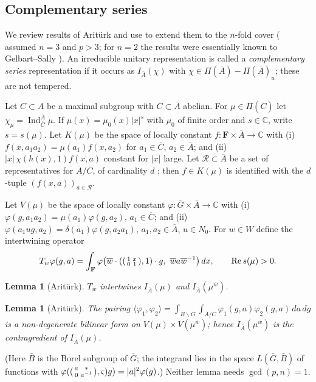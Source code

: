 \documentclass[12pt,letterpaper]{article}
\newtheorem{lemma}[theorem]{Lemma}
\theoremstyle{definition}
\theoremstyle{remark}
\newcommand{\F}{\mathbf{F}}
\newcommand{\C}{\mathbb C}
\newcommand{\bG}{\overline{G}}
\newcommand{\bA}{\overline{A}}
\newcommand{\bC}{\overline{C}}
\newcommand{\bw}{\overline{w}}
\newcommand{\Ind}{\operatorname{Ind}}
\newcommand{\vphi}{\varphi}
\begin{document}
\subsection{Complementary series}\label{subsec:cs}

We review results of Arit\"urk \cite{Ar80} and use \cite{FK86} to extend them to the $n$-fold cover
(\cite{Ar80} assumed $n=3$ and $p>3$; for $n=2$ the results were essentially known to Gelbart--Sally
\cite{GS75}). An irreducible unitary representation is called a \emph{complementary series} representation if it occurs as
$I_{\bA}(\chi)$ with $\chi\in\Pi(\bA)-\Pi(\bA)_u$; these are not tempered.

Let $C\subset A$ be a maximal subgroup with $\bC\subset\bA$ abelian. For $\mu\in\Pi(\bC)$ let
$\chi_\mu=\Ind_{\bC}^{\bA}\mu$. If $\mu(x)=\mu_0(x)|x|^s$ with $\mu_0$ of finite order and
$s\in\C$, write $s=s(\mu)$. Let $K(\mu)$ be the space of locally constant $f:\F\times\bA\to\C$ with
(i) $f(x,a_1a_2)=\mu(a_1)f(x,a_2)$ for $a_1\in\bC$, $a_2\in\bA$; and
(ii) $|x|\,\chi(h(x),1)f(x,a)$ constant for $|x|$ large. Let $\mathcal R\subset\bA$ be a set of
representatives for $\bA/\bC$, of cardinality $d$ ; then $f\in K(\mu)$ is
identified with the $d$-tuple $(f(x,a))_{a\in\mathcal R}$.

Let $V(\mu)$ be the space of locally constant $\vphi:\bG\times\bA\to\C$ with
(i) $\vphi(g,a_1a_2)=\mu(a_1)\vphi(g,a_2)$, $a_1\in\bC$; and
(ii) $\vphi(a_1ug,a_2)=\delta(a_1)\vphi(g,a_2a_1)$, $a_1,a_2\in\bA$, $u\in N_0$.
For $w\in W$ define the intertwining operator
\[
T_w\vphi(g,a)=\int_{\F}\vphi\bigl(\bw\cdot(\begin{psmallmatrix}1&x\\0&1\end{psmallmatrix},1)\cdot g,\ \bw a\bw^{-1}\bigr)\,dx,
\qquad \mathrm{Re}\,s(\mu)>0.
\]
\begin{lemma}[Arit\"urk]\label{lem:T} $T_w$ intertwines $I_{\bA}(\mu)$ and $I_{\bA}(\mu^{\bw})$.\end{lemma}
\begin{lemma}[Arit\"urk]\label{lem:contra} The pairing
$\langle\vphi_1,\vphi_2\rangle=\int_{\bar B\backslash\bG}\int_{\bA/\bC}\vphi_1(g,a)\vphi_2(g,a)\,da\,dg$
is a non-degenerate bilinear form on $V(\mu)\times V(\mu^{\bw})$; hence $I_{\bA}(\mu^{\bw})$ is the
contragredient of $I_{\bA}(\mu)$.\end{lemma}
(Here $\bar B$ is the Borel subgroup of $\bG$; the integrand lies in the space $L(\bG,\bar B)$ of functions
with $\vphi(\begin{psmallmatrix}a&*\\0&a^{-1}\end{psmallmatrix},\varsigma)g)=|a|^2\vphi(g)$.) Neither
lemma needs $\gcd(p,n)=1$.
\end{document}
